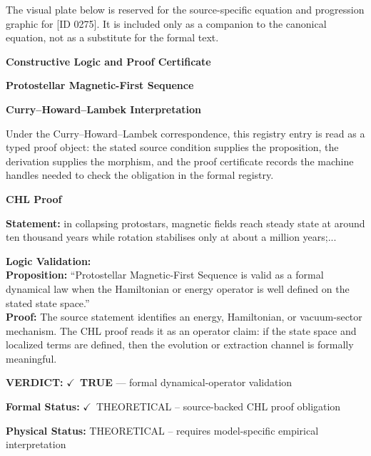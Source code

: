 \begingroup\footnotesize\sloppy
The visual plate below is reserved for the source-specific equation and progression graphic for [ID 0275]. It is included only as a companion to the canonical equation, not as a substitute for the formal text.
\par\endgroup
\ifTZPDarkEdition
{}
\fi

\clearpage
\begingroup\tzpsupportsetup
\noindent\textbf{\fontsize{10.8pt}{12.8pt}\selectfont [ID 0275] Constructive Logic and Proof Certificate}\par
\noindent\textbf{\fontsize{10pt}{12pt}\selectfont Protostellar Magnetic-First Sequence}\par
\vspace{0.45em}
\begingroup
\footnotesize
\setlength{\parskip}{0.22em}
\setlength{\parindent}{0pt}
\noindent\textbf{Curry--Howard--Lambek Interpretation}\par
Under the Curry--Howard--Lambek correspondence, this registry entry is read as a typed proof
object: the stated source condition supplies the proposition, the derivation supplies the
morphism, and the proof certificate records the machine handles needed to check the obligation
in the formal registry.

\vspace{0.45em}
\noindent\textbf{CHL Proof}\par
\textbf{Statement:} in collapsing protostars, magnetic fields reach steady state at around ten thousand
years while rotation stabilises only at about a million years;...

\textbf{Logic Validation:}\\
\textbf{Proposition:} ``Protostellar Magnetic-First Sequence is valid as a formal dynamical law when the
Hamiltonian or energy operator is well defined on the stated state space.''\\
\textbf{Proof:} The source statement identifies an energy, Hamiltonian, or vacuum-sector mechanism. The
CHL proof reads it as an operator claim: if the state space and localized terms are
defined, then the evolution or extraction channel is formally meaningful.

\textbf{VERDICT:} \ensuremath{\checkmark}\ \textbf{TRUE} --- formal dynamical-operator validation

\textbf{Formal Status:} \ensuremath{\checkmark}\ THEORETICAL -- source-backed CHL proof obligation

\textbf{Physical Status:} THEORETICAL -- requires model-specific empirical interpretation
\par\vspace{0.45em}
\par
\ifTZPDarkEdition
{}
\fi
\endgroup
\endgroup
